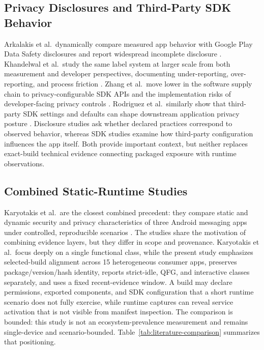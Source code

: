\subsection{Privacy Disclosures and Third-Party SDK Behavior}
Arkalakis et al.\ dynamically compare measured app behavior with Google Play Data Safety disclosures and report widespread incomplete disclosure \cite{arkalakis2024datasafety}. Khandelwal et al.\ study the same label system at larger scale from both measurement and developer perspectives, documenting under-reporting, over-reporting, and process friction \cite{khandelwal2024privacylabels}. Zhang et al.\ move lower in the software supply chain to privacy-configurable SDK APIs and the implementation risks of developer-facing privacy controls \cite{zhang2024privacysdks}. Rodriguez et al.\ similarly show that third-party SDK settings and defaults can shape downstream application privacy posture \cite{rodriguez2025privacysettings}. Disclosure studies ask whether declared practices correspond to observed behavior, whereas SDK studies examine how third-party configuration influences the app itself. Both provide important context, but neither replaces exact-build technical evidence connecting packaged exposure with runtime observations.

\subsection{Combined Static-Runtime Studies}
Karyotakis et al.\ are the closest combined precedent: they compare static and dynamic security and privacy characteristics of three Android messaging apps under controlled, reproducible scenarios \cite{karyotakis2026messaging}. The studies share the motivation of combining evidence layers, but they differ in scope and provenance. Karyotakis et al.\ focus deeply on a single functional class, while the present study emphasizes selected-build alignment across 15 heterogeneous consumer apps, preserves package/version/hash identity, reports strict-idle, QFG, and interactive classes separately, and uses a fixed recent-evidence window. A build may declare permissions, exported components, and SDK configuration that a short runtime scenario does not fully exercise, while runtime captures can reveal service activation that is not visible from manifest inspection. The comparison is bounded: this study is not an ecosystem-prevalence measurement and remains single-device and scenario-bounded. Table~\ref{tab:literature-comparison} summarizes that positioning.

